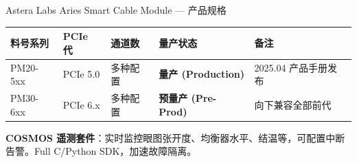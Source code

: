 \documentclass[aspectratio=169, 10pt, UTF8]{ctexbeamer}
\begin{document}
\begin{frame}{Astera Labs Aries Smart Cable Module — 产品规格}
  \vspace{4pt}
  \centering
  \footnotesize
  \begin{tabularx}{\textwidth}{p{2.0cm} p{2.2cm} p{2.2cm} p{3.0cm} p{3.0cm}}
    \toprule
    \textbf{料号系列} & \textbf{PCIe 代} & \textbf{通道数} & \textbf{量产状态} & \textbf{备注} \\
    \midrule
    PM20-5xx & PCIe 5.0 & 多种配置 & \textbf{量产 (Production)} & 2025.04 产品手册发布 \\
    PM30-6xx & PCIe 6.x & 多种配置 & \textbf{预量产 (Pre-Prod)} & 向下兼容全部前代 \\
    \bottomrule
  \end{tabularx}

  \vspace{4pt}
  \begin{center}
    \textbf{COSMOS 遥测套件}：实时监控眼图张开度、均衡器水平、结温等，可配置中断告警。Full C/Python SDK，加速故障隔离。
  \end{center}
\end{frame}
\end{document}
